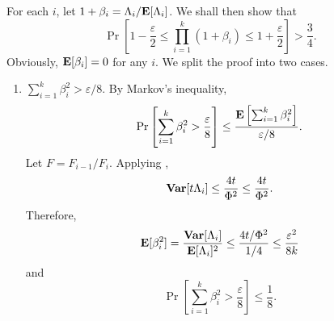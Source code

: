 For each $i$, let $1+\beta_i = \Lambda_i / \textbf{E}[\Lambda_i]$. We shall then show that
\begin{equation}
	\Pr\left[1-\frac{\varepsilon}{2} \leq \prod_{i=1}^k (1+\beta_i) \leq 1+\frac{\varepsilon}{2}\right] > \frac{3}{4}.
\end{equation}
Obviously, $\textbf{E}[\beta_i]=0$ for any $i$. We split the proof into two cases.\\
\begin{enumerate}
	\item $\sum_{i=1}^k \beta_i^2 > \varepsilon/8$. By Markov's inequality,
	\[ \Pr\left[\sum_{i=1}^k \beta_i^2 > \frac{\varepsilon}{8}\right] \leq \frac{\textbf{E}\left[\sum_{i=1}^k \beta_i^2\right]}{\varepsilon/8}. \]
	Let $F=F_{i-1}/F_i$. Applying ,
	\[ \operatorname{\textbf{Var}}[t\Lambda_i] \leq \frac{4t}{\Phi^2} \leq \frac{4t}{\Phi^2}. \]
	Therefore,
	\[ \textbf{E}[\beta_i^2] = \frac{\operatorname{\textbf{Var}}[\Lambda_i]}{\textbf{E}[\Lambda_i]^2} \leq \frac{4t/\Phi^2}{1/4} \leq \frac{\varepsilon^2}{8k} \]
	and
	\[ \Pr\left[\sum_{i=1}^k \beta_i^2 > \frac{\varepsilon}{8}\right] \leq \frac{1}{8}. \]


\end{enumerate}
